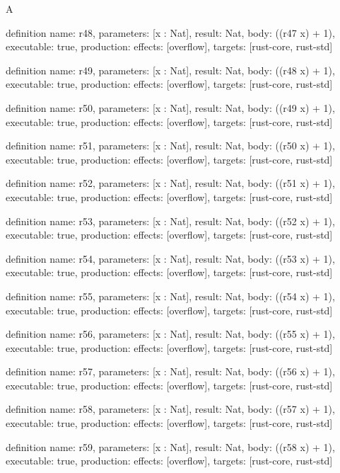 \begin{lexlean}{A}
\begin{semanticmodule}
definition{
  name: r48,
  parameters: [x : Nat],
  result: Nat,
  body: ((r47 x) + 1),
  executable: true,
  production: {effects: [overflow], targets: [rust-core, rust-std]}
}

definition{
  name: r49,
  parameters: [x : Nat],
  result: Nat,
  body: ((r48 x) + 1),
  executable: true,
  production: {effects: [overflow], targets: [rust-core, rust-std]}
}

definition{
  name: r50,
  parameters: [x : Nat],
  result: Nat,
  body: ((r49 x) + 1),
  executable: true,
  production: {effects: [overflow], targets: [rust-core, rust-std]}
}

definition{
  name: r51,
  parameters: [x : Nat],
  result: Nat,
  body: ((r50 x) + 1),
  executable: true,
  production: {effects: [overflow], targets: [rust-core, rust-std]}
}

definition{
  name: r52,
  parameters: [x : Nat],
  result: Nat,
  body: ((r51 x) + 1),
  executable: true,
  production: {effects: [overflow], targets: [rust-core, rust-std]}
}

definition{
  name: r53,
  parameters: [x : Nat],
  result: Nat,
  body: ((r52 x) + 1),
  executable: true,
  production: {effects: [overflow], targets: [rust-core, rust-std]}
}

definition{
  name: r54,
  parameters: [x : Nat],
  result: Nat,
  body: ((r53 x) + 1),
  executable: true,
  production: {effects: [overflow], targets: [rust-core, rust-std]}
}

definition{
  name: r55,
  parameters: [x : Nat],
  result: Nat,
  body: ((r54 x) + 1),
  executable: true,
  production: {effects: [overflow], targets: [rust-core, rust-std]}
}

definition{
  name: r56,
  parameters: [x : Nat],
  result: Nat,
  body: ((r55 x) + 1),
  executable: true,
  production: {effects: [overflow], targets: [rust-core, rust-std]}
}

definition{
  name: r57,
  parameters: [x : Nat],
  result: Nat,
  body: ((r56 x) + 1),
  executable: true,
  production: {effects: [overflow], targets: [rust-core, rust-std]}
}

definition{
  name: r58,
  parameters: [x : Nat],
  result: Nat,
  body: ((r57 x) + 1),
  executable: true,
  production: {effects: [overflow], targets: [rust-core, rust-std]}
}

definition{
  name: r59,
  parameters: [x : Nat],
  result: Nat,
  body: ((r58 x) + 1),
  executable: true,
  production: {effects: [overflow], targets: [rust-core, rust-std]}
}
\end{semanticmodule}
\end{lexlean}
